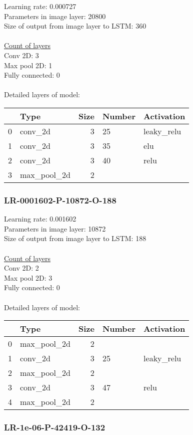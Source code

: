 Learning rate: 0.000727
\\Parameters in image layer: 20800
\\Size of output from image layer to LSTM: 360
\\\\\underline{Count of layers} 
\\Conv 2D:           3\\Max pool 2D:      1\\Fully connected:  0
\\\\Detailed layers of model: \\\begin{tabular}{rlrll}
\hline
    & Type        &   Size & Number   & Activation   \\
\hline
  0 & conv\_2d     &      3 & 25       & leaky\_relu   \\
  1 & conv\_2d     &      3 & 35       & elu          \\
  2 & conv\_2d     &      3 & 40       & relu         \\
  3 & max\_pool\_2d &      2 &          &              \\
\hline
\end{tabular}\subsubsection*{LR-0001602-P-10872-O-188}
Learning rate: 0.001602
\\Parameters in image layer: 10872
\\Size of output from image layer to LSTM: 188
\\\\\underline{Count of layers} 
\\Conv 2D:           2\\Max pool 2D:      3\\Fully connected:  0
\\\\Detailed layers of model: \\\begin{tabular}{rlrll}
\hline
    & Type        &   Size & Number   & Activation   \\
\hline
  0 & max\_pool\_2d &      2 &          &              \\
  1 & conv\_2d     &      3 & 25       & leaky\_relu   \\
  2 & max\_pool\_2d &      2 &          &              \\
  3 & conv\_2d     &      3 & 47       & relu         \\
  4 & max\_pool\_2d &      2 &          &              \\
\hline
\end{tabular}\subsubsection*{LR-1e-06-P-42419-O-132}
